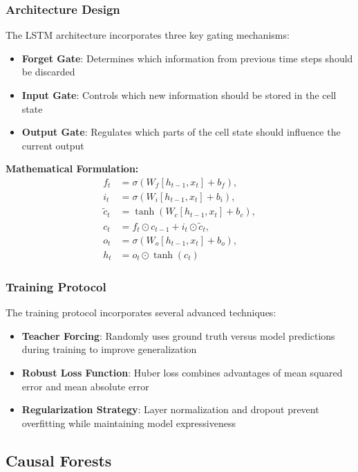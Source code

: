 \subsubsection{Architecture Design}
The LSTM architecture incorporates three key gating mechanisms:
\begin{itemize}
    \item \textbf{Forget Gate}: Determines which information from previous time steps should be discarded
    \item \textbf{Input Gate}: Controls which new information should be stored in the cell state
    \item \textbf{Output Gate}: Regulates which parts of the cell state should influence the current output
\end{itemize}

\textbf{Mathematical Formulation:}
\begin{align}
  f_t &= \sigma(W_f [h_{t-1}, x_t] + b_f), \\
  i_t &= \sigma(W_i [h_{t-1}, x_t] + b_i), \\
  \tilde{c}_t &= \tanh(W_c [h_{t-1}, x_t] + b_c), \\
  c_t &= f_t \odot c_{t-1} + i_t \odot \tilde{c}_t, \\
  o_t &= \sigma(W_o [h_{t-1}, x_t] + b_o), \\
  h_t &= o_t \odot \tanh(c_t)
\end{align}

\subsubsection{Training Protocol}
The training protocol incorporates several advanced techniques:
\begin{itemize}
    \item \textbf{Teacher Forcing}: Randomly uses ground truth versus model predictions during training to improve generalization
    \item \textbf{Robust Loss Function}: Huber loss combines advantages of mean squared error and mean absolute error
    \item \textbf{Regularization Strategy}: Layer normalization and dropout prevent overfitting while maintaining model expressiveness
\end{itemize}

\subsection{Causal Forests}\label{subsec:cforests}

